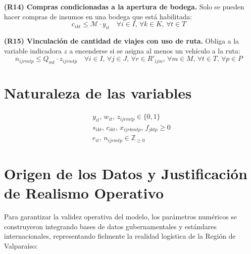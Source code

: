 \documentclass[letterpaper]{article}
\begin{document}
\begin{flushleft}
\textbf{(R14) Compras condicionadas a la apertura de bodega.} Solo se pueden hacer compras de insumos en una bodega que está habilitada:
\begin{equation}
c_{ikt} \leq \mathcal{M} \cdot y_{it} \quad \forall i \in I,\, \forall k \in K,\, \forall t \in T
\end{equation}

\textbf{(R15) Vinculación de cantidad de viajes con uso de ruta.} Obliga a la variable indicadora $z$ a encenderse si se asigna al menos un vehículo a la ruta:
\begin{equation}
n_{ijrmtp} \leq Q_{mt} \cdot z_{ijrmtp}
\quad \forall i \in I,\, \forall j \in J,\, \forall r \in R'_{ijm},\, \forall m \in M,\, \forall t \in T,\, \forall p \in P
\end{equation}

\section{Naturaleza de las variables}

\begin{align*}
& y_{it},\, w_{it},\, z_{ijrmtp} \in \{0,1\} \\
& s_{ikt},\, c_{ikt},\, x_{ijrkmtp},\, f_{jktp} \geq 0 \\
& e_{it},\, n_{ijrmtp} \in \mathbb{Z}_{\geq 0}
\end{align*}

\section{Origen de los Datos y Justificación de Realismo Operativo}

Para garantizar la validez operativa del modelo, los parámetros numéricos se construyeron integrando bases de datos gubernamentales y estándares internacionales, representando fielmente la realidad logística de la Región de Valparaíso:


\end{flushleft}
\end{document}
